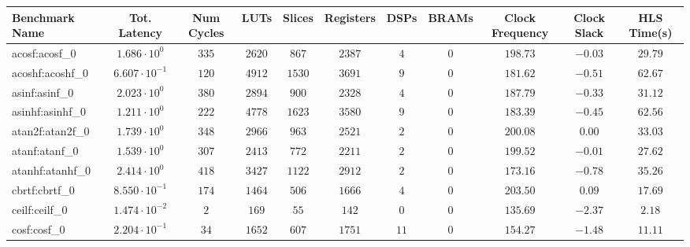 \begin{tabular}{|l|c|c|c|c|c|c|c|c|c|c|}
\hline
Benchmark Name               & Tot. Latency            & Num Cycles & LUTs      & Slices    & Registers & DSPs    & BRAMs & Clock Frequency & Clock Slack & HLS Time(s) \\
\hline
acosf:acosf\_0               & $ 1.686 \cdot 10^{0}  $ & $ 335    $ & $ 2620  $ & $ 867   $ & $ 2387  $ & $ 4   $ & $ 0 $ & $ 198.73      $ & $ -0.03   $ & $ 29.79   $ \\
acoshf:acoshf\_0             & $ 6.607 \cdot 10^{-1} $ & $ 120    $ & $ 4912  $ & $ 1530  $ & $ 3691  $ & $ 9   $ & $ 0 $ & $ 181.62      $ & $ -0.51   $ & $ 62.67   $ \\
asinf:asinf\_0               & $ 2.023 \cdot 10^{0}  $ & $ 380    $ & $ 2894  $ & $ 900   $ & $ 2328  $ & $ 4   $ & $ 0 $ & $ 187.79      $ & $ -0.33   $ & $ 31.12   $ \\
asinhf:asinhf\_0             & $ 1.211 \cdot 10^{0}  $ & $ 222    $ & $ 4778  $ & $ 1623  $ & $ 3580  $ & $ 9   $ & $ 0 $ & $ 183.39      $ & $ -0.45   $ & $ 62.56   $ \\
atan2f:atan2f\_0             & $ 1.739 \cdot 10^{0}  $ & $ 348    $ & $ 2966  $ & $ 963   $ & $ 2521  $ & $ 2   $ & $ 0 $ & $ 200.08      $ & $ 0.00    $ & $ 33.03   $ \\
atanf:atanf\_0               & $ 1.539 \cdot 10^{0}  $ & $ 307    $ & $ 2413  $ & $ 772   $ & $ 2211  $ & $ 2   $ & $ 0 $ & $ 199.52      $ & $ -0.01   $ & $ 27.62   $ \\
atanhf:atanhf\_0             & $ 2.414 \cdot 10^{0}  $ & $ 418    $ & $ 3427  $ & $ 1122  $ & $ 2912  $ & $ 2   $ & $ 0 $ & $ 173.16      $ & $ -0.78   $ & $ 35.26   $ \\
cbrtf:cbrtf\_0               & $ 8.550 \cdot 10^{-1} $ & $ 174    $ & $ 1464  $ & $ 506   $ & $ 1666  $ & $ 4   $ & $ 0 $ & $ 203.50      $ & $ 0.09    $ & $ 17.69   $ \\
ceilf:ceilf\_0               & $ 1.474 \cdot 10^{-2} $ & $ 2      $ & $ 169   $ & $ 55    $ & $ 142   $ & $ 0   $ & $ 0 $ & $ 135.69      $ & $ -2.37   $ & $ 2.18    $ \\
cosf:cosf\_0                 & $ 2.204 \cdot 10^{-1} $ & $ 34     $ & $ 1652  $ & $ 607   $ & $ 1751  $ & $ 11  $ & $ 0 $ & $ 154.27      $ & $ -1.48   $ & $ 11.11   $ \\

\end{tabular}
